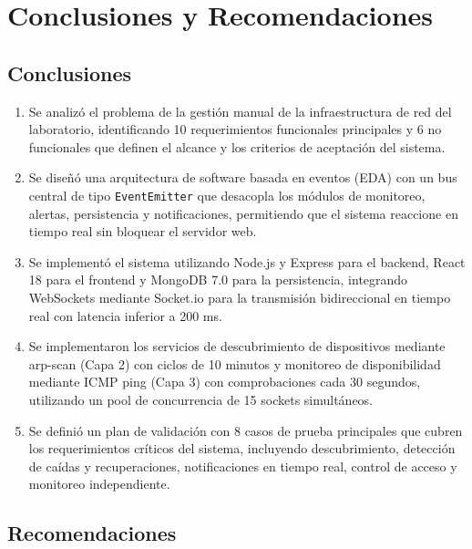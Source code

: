\documentclass[12pt,a4paper]{report}
\begin{document}
\chapter{Conclusiones y Recomendaciones}

\section{Conclusiones}

\begin{enumerate}
  \item Se analizó el problema de la gestión manual de la infraestructura de red del laboratorio, identificando 10 requerimientos funcionales principales y 6 no funcionales que definen el alcance y los criterios de aceptación del sistema.

  \item Se diseñó una arquitectura de software basada en eventos (EDA) con un bus central de tipo \texttt{EventEmitter} que desacopla los módulos de monitoreo, alertas, persistencia y notificaciones, permitiendo que el sistema reaccione en tiempo real sin bloquear el servidor web.

  \item Se implementó el sistema utilizando Node.js y Express para el backend, React 18 para el frontend y MongoDB 7.0 para la persistencia, integrando WebSockets mediante Socket.io para la transmisión bidireccional en tiempo real con latencia inferior a 200 ms.

  \item Se implementaron los servicios de descubrimiento de dispositivos mediante arp-scan (Capa 2) con ciclos de 10 minutos y monitoreo de disponibilidad mediante ICMP ping (Capa 3) con comprobaciones cada 30 segundos, utilizando un pool de concurrencia de 15 sockets simultáneos.

  \item Se definió un plan de validación con 8 casos de prueba principales que cubren los requerimientos críticos del sistema, incluyendo descubrimiento, detección de caídas y recuperaciones, notificaciones en tiempo real, control de acceso y monitoreo independiente.
\end{enumerate}

\section{Recomendaciones}
\end{document}
